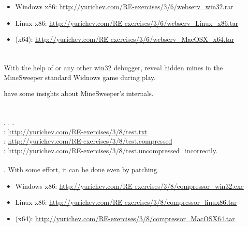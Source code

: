 \begin{itemize}
\item Windows x86: \url{http://yurichev.com/RE-exercises/3/6/webserv_win32.rar}
\item Linux x86: \url{http://yurichev.com/RE-exercises/3/6/webserv_Linux_x86.tar}
\item \MacOSX (x64): \url{http://yurichev.com/RE-exercises/3/6/webserv_MacOSX_x64.tar}
\end{itemize}

\section{}

{With the help of \tracer or any other win32 debugger, reveal hidden mines in the MineSweeper standard Widnows game
during play}.

 \cite{trew} 
{have some insights about MineSweeper's internals}.

\section{}

.
.
.\\
: 
\url{http://yurichev.com/RE-exercises/3/8/test.txt}\\
: 
\url{http://yurichev.com/RE-exercises/3/8/test.compressed}\\
:
\url{http://yurichev.com/RE-exercises/3/8/test.uncompressed_incorrectly}.\\
\\
.
{With some effort, it can be done even by patching}.

\begin{itemize}
\item Windows x86: \url{http://yurichev.com/RE-exercises/3/8/compressor_win32.exe}
\item Linux x86: \url{http://yurichev.com/RE-exercises/3/8/compressor_linux86.tar}
\item \MacOSX (x64): \url{http://yurichev.com/RE-exercises/3/8/compressor_MacOSX64.tar}
\end{itemize}

